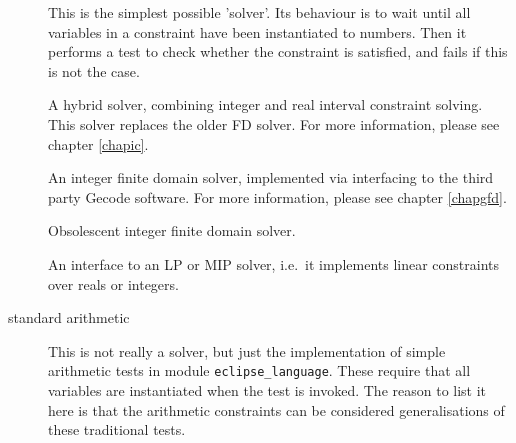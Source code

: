 \begin{description}
\item[]
    This is the simplest possible 'solver'. Its behaviour is to wait until
    all variables in a constraint have been instantiated to numbers.
    Then it performs a test to check whether the constraint is satisfied,
    and fails if this is not the case.

\item[]
    A hybrid solver, combining integer and real interval constraint
    solving.  This solver replaces the older FD solver.
    For more information, please see chapter \ref{chapic}.

\item[]
    An integer finite domain solver, implemented via interfacing
    to the third party Gecode software.
    For more information, please see chapter \ref{chapgfd}.

\item[]
    Obsolescent integer finite domain solver.

\item[]
    An interface to an LP or MIP solver, i.e.\ it implements linear
    constraints over reals or integers.


\item[standard arithmetic]
    This is not really a solver, but just the implementation of simple
    arithmetic tests in module {\tt eclipse_language}. These require
    that all variables are instantiated when the test is invoked.
    The reason to list it here is that the arithmetic constraints
    can be considered generalisations of these traditional tests.
\end{description}

